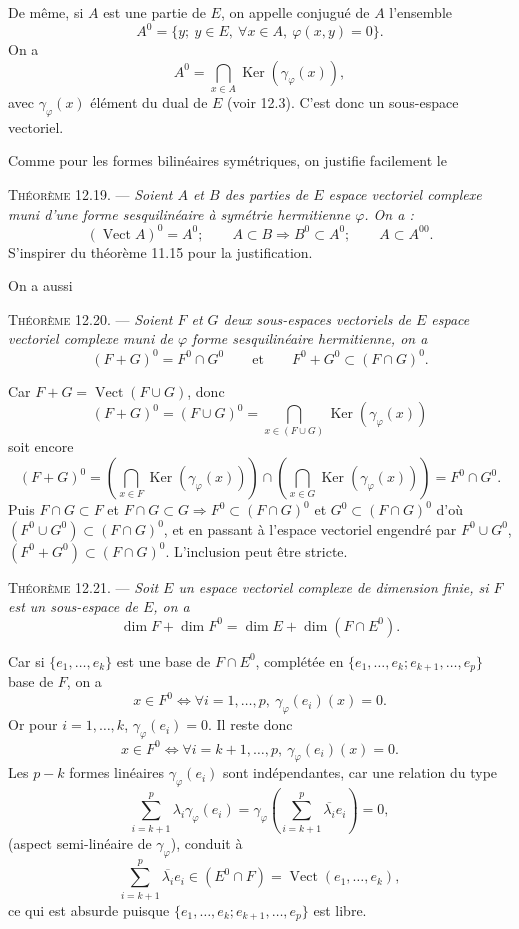 De même, si $A$ est une partie de $E$, on appelle conjugué de $A$ l'ensemble
\[
A^0=\{y;\ y\in E,\ \forall x\in A,\ \varphi(x,y)=0\}.
\]
On a
\[
A^0=\bigcap_{x\in A}\operatorname{Ker}(\gamma_\varphi(x)),
\]
avec $\gamma_\varphi(x)$ élément du dual de $E$ (voir 12.3). C'est donc un sous-espace vectoriel.

Comme pour les formes bilinéaires symétriques, on justifie facilement le

\medskip\noindent\textsc{Théorème 12.19.} --- \emph{Soient $A$ et $B$ des parties de $E$ espace vectoriel complexe muni d'une forme sesquilinéaire à symétrie hermitienne $\varphi$. On a :
\[
(\operatorname{Vect}A)^0=A^0;\qquad A\subset B\Rightarrow B^0\subset A^0;\qquad A\subset A^{00}.
\]}
S'inspirer du théorème 11.15 pour la justification. \bookend

On a aussi

\medskip\noindent\textsc{Théorème 12.20.} --- \emph{Soient $F$ et $G$ deux sous-espaces vectoriels de $E$ espace vectoriel complexe muni de $\varphi$ forme sesquilinéaire hermitienne, on a
\[
(F+G)^0=F^0\cap G^0\qquad\text{et}\qquad F^0+G^0\subset(F\cap G)^0.
\]}

Car $F+G=\operatorname{Vect}(F\cup G)$, donc
\[
(F+G)^0=(F\cup G)^0=\bigcap_{x\in(F\cup G)}\operatorname{Ker}(\gamma_\varphi(x))
\]
soit encore
\[
(F+G)^0=\left(\bigcap_{x\in F}\operatorname{Ker}(\gamma_\varphi(x))\right)
\cap
\left(\bigcap_{x\in G}\operatorname{Ker}(\gamma_\varphi(x))\right)=F^0\cap G^0.
\]
Puis $F\cap G\subset F$ et $F\cap G\subset G\Rightarrow F^0\subset(F\cap G)^0$ et $G^0\subset(F\cap G)^0$ d'où $(F^0\cup G^0)\subset(F\cap G)^0$, et en passant à l'espace vectoriel engendré par $F^0\cup G^0$, $(F^0+G^0)\subset(F\cap G)^0$. L'inclusion peut être stricte. \bookend

\medskip\noindent\textsc{Théorème 12.21.} --- \emph{Soit $E$ un espace vectoriel complexe de dimension finie, si $F$ est un sous-espace de $E$, on a
\[
\dim F+\dim F^0=\dim E+\dim(F\cap E^0).
\]}

Car si $\{e_1,\ldots,e_k\}$ est une base de $F\cap E^0$, complétée en $\{e_1,\ldots,e_k;e_{k+1},\ldots,e_p\}$ base de $F$, on a
\[
x\in F^0\Longleftrightarrow \forall i=1,\ldots,p,\ \gamma_\varphi(e_i)(x)=0.
\]
Or pour $i=1,\ldots,k$, $\gamma_\varphi(e_i)=0$. Il reste donc
\[
x\in F^0\Longleftrightarrow \forall i=k+1,\ldots,p,\ \gamma_\varphi(e_i)(x)=0.
\]
Les $p-k$ formes linéaires $\gamma_\varphi(e_i)$ sont indépendantes, car une relation du type
\[
\sum_{i=k+1}^p\lambda_i\gamma_\varphi(e_i)
=\gamma_\varphi\left(\sum_{i=k+1}^p\overline{\lambda_i}e_i\right)=0,
\]
(aspect semi-linéaire de $\gamma_\varphi$), conduit à
\[
\sum_{i=k+1}^p\overline{\lambda_i}e_i\in(E^0\cap F)=\operatorname{Vect}(e_1,\ldots,e_k),
\]
ce qui est absurde puisque $\{e_1,\ldots,e_k;e_{k+1},\ldots,e_p\}$ est libre.

